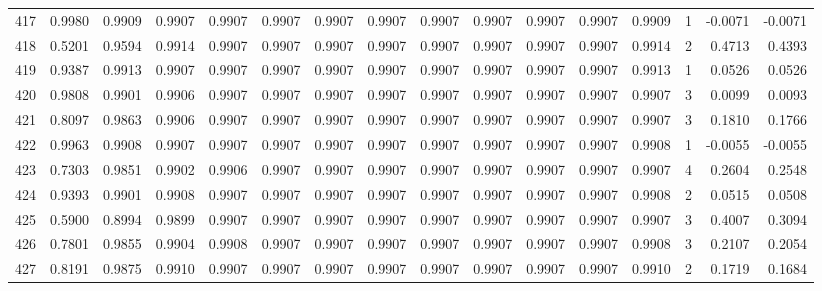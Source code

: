 \begin{tabular}{lrrrrrrrrrrrrrrr}
417 &      0.9980 &  0.9909 &  0.9907 &  0.9907 &  0.9907 &  0.9907 &  0.9907 &  0.9907 &  0.9907 &  0.9907 &   0.9907 &     0.9909 &      1 &                   -0.0071 &                    -0.0071 \\
418 &      0.5201 &  0.9594 &  0.9914 &  0.9907 &  0.9907 &  0.9907 &  0.9907 &  0.9907 &  0.9907 &  0.9907 &   0.9907 &     0.9914 &      2 &                    0.4713 &                     0.4393 \\
419 &      0.9387 &  0.9913 &  0.9907 &  0.9907 &  0.9907 &  0.9907 &  0.9907 &  0.9907 &  0.9907 &  0.9907 &   0.9907 &     0.9913 &      1 &                    0.0526 &                     0.0526 \\
420 &      0.9808 &  0.9901 &  0.9906 &  0.9907 &  0.9907 &  0.9907 &  0.9907 &  0.9907 &  0.9907 &  0.9907 &   0.9907 &     0.9907 &      3 &                    0.0099 &                     0.0093 \\
421 &      0.8097 &  0.9863 &  0.9906 &  0.9907 &  0.9907 &  0.9907 &  0.9907 &  0.9907 &  0.9907 &  0.9907 &   0.9907 &     0.9907 &      3 &                    0.1810 &                     0.1766 \\
422 &      0.9963 &  0.9908 &  0.9907 &  0.9907 &  0.9907 &  0.9907 &  0.9907 &  0.9907 &  0.9907 &  0.9907 &   0.9907 &     0.9908 &      1 &                   -0.0055 &                    -0.0055 \\
423 &      0.7303 &  0.9851 &  0.9902 &  0.9906 &  0.9907 &  0.9907 &  0.9907 &  0.9907 &  0.9907 &  0.9907 &   0.9907 &     0.9907 &      4 &                    0.2604 &                     0.2548 \\
424 &      0.9393 &  0.9901 &  0.9908 &  0.9907 &  0.9907 &  0.9907 &  0.9907 &  0.9907 &  0.9907 &  0.9907 &   0.9907 &     0.9908 &      2 &                    0.0515 &                     0.0508 \\
425 &      0.5900 &  0.8994 &  0.9899 &  0.9907 &  0.9907 &  0.9907 &  0.9907 &  0.9907 &  0.9907 &  0.9907 &   0.9907 &     0.9907 &      3 &                    0.4007 &                     0.3094 \\
426 &      0.7801 &  0.9855 &  0.9904 &  0.9908 &  0.9907 &  0.9907 &  0.9907 &  0.9907 &  0.9907 &  0.9907 &   0.9907 &     0.9908 &      3 &                    0.2107 &                     0.2054 \\
427 &      0.8191 &  0.9875 &  0.9910 &  0.9907 &  0.9907 &  0.9907 &  0.9907 &  0.9907 &  0.9907 &  0.9907 &   0.9907 &     0.9910 &      2 &                    0.1719 &                     0.1684 \\

\end{tabular}
